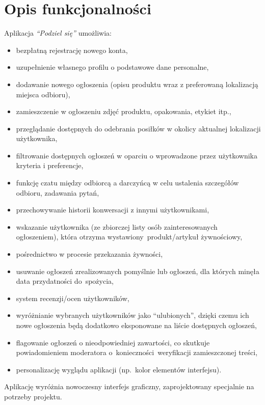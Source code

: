 \documentclass[licencjacka]{pracamgr}
\begin{document}
\section*{Opis funkcjonalności}
Aplikacja \textit{``Podziel się''} umożliwia:
\begin{itemize}
\setlength\itemsep{-0.2em}
\item bezpłatną rejestrację nowego konta,
\item uzupełnienie własnego profilu o podstawowe dane personalne,
\item dodawanie nowego ogłoszenia (opisu produktu wraz z preferowaną lokalizacją miejsca odbioru),
\item zamieszczenie w ogłoszeniu zdjęć produktu, opakowania, etykiet itp.,
\item przeglądanie dostępnych do odebrania posiłków w okolicy aktualnej lokalizacji użytkownika,
\item filtrowanie dostępnych ogłoszeń w oparciu o wprowadzone przez użytkownika kryteria i preferencje,
\item funkcję czatu między odbiorcą a darczyńcą w celu ustalenia szczegółów odbioru, zadawania pytań,
\item przechowywanie historii konwersacji z innymi użytkownikami,
\item wskazanie użytkownika (ze zbiorczej listy osób zainteresowanych ogłoszeniem), która otrzyma wystawiony~produkt/artykuł żywnościowy,
\item pośrednictwo w procesie przekazania żywności,
\item usuwanie ogłoszeń zrealizowanych pomyślnie lub ogłoszeń, dla których minęła data przydatności do~spożycia,
\item system recenzji/ocen użytkowników,
\item wyróżnianie wybranych użytkowników jako ``ulubionych'', dzięki czemu ich nowe ogłoszenia będą dodatkowo eksponowane na liście dostępnych ogłoszeń,
\item flagowanie ogłoszeń o nieodpowiedniej zawartości, co skutkuje powiadomieniem moderatora o~konieczności~weryfikacji zamieszczonej treści,
\item personalizację wyglądu aplikacji (np.\ kolor elementów interfejsu).
\end{itemize}
Aplikację wyróżnia nowoczesny interfejs graficzny, zaprojektowany specjalnie na potrzeby projektu.

\end{document}
